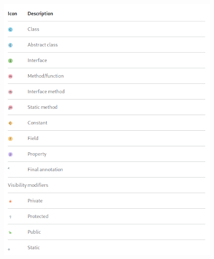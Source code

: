 \documentclass[12pt]{article}
\begin{document}
\begin{figure}[h]
  \center
  \includegraphics[width=16cm]{icons_legend.png}
\end{figure}

%
%
\end{document}
